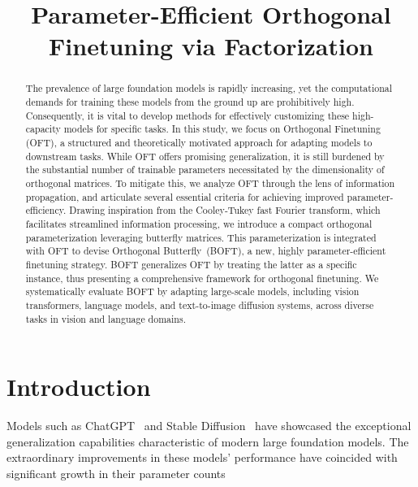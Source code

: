 \title{Parameter-Efficient Orthogonal Finetuning via Factorization}

\begin{abstract}
The prevalence of large foundation models is rapidly increasing, yet the computational demands for training these models from the ground up are prohibitively high. Consequently, it is vital to develop methods for effectively customizing these high-capacity models for specific tasks. In this study, we focus on Orthogonal Finetuning (OFT), a structured and theoretically motivated approach for adapting models to downstream tasks. While OFT offers promising generalization, it is still burdened by the substantial number of trainable parameters necessitated by the dimensionality of orthogonal matrices. To mitigate this, we analyze OFT through the lens of information propagation, and articulate several essential criteria for achieving improved parameter-efficiency. Drawing inspiration from the Cooley-Tukey fast Fourier transform, which facilitates streamlined information processing, we introduce a compact orthogonal parameterization leveraging butterfly matrices. This parameterization is integrated with OFT to devise Orthogonal Butterfly~(BOFT), a new, highly parameter-efficient finetuning strategy. BOFT generalizes OFT by treating the latter as a specific instance, thus presenting a comprehensive framework for orthogonal finetuning. We systematically evaluate BOFT by adapting large-scale models, including vision transformers, language models, and text-to-image diffusion systems, across diverse tasks in vision and language domains.
\end{abstract}

\section{Introduction}

Models such as ChatGPT~\cite{brown2020language,chen2021evaluating} and Stable Diffusion~\cite{rombach2022high} have showcased the exceptional generalization capabilities characteristic of modern large foundation models. The extraordinary improvements in these models’ performance have coincided with significant growth in their parameter counts

